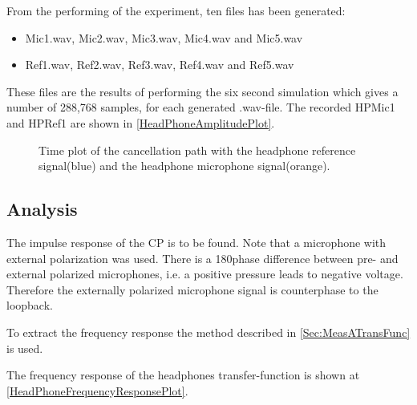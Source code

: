 From the performing of the experiment, ten files has been generated:
\begin{itemize}
	\item Mic1.wav, Mic2.wav, Mic3.wav, Mic4.wav and Mic5.wav
	\item Ref1.wav, Ref2.wav, Ref3.wav, Ref4.wav and Ref5.wav
\end{itemize}

These files are the results of performing the six second simulation which gives a number of 288,768 samples, for each generated .wav-file. 
The recorded HPMic1 and HPRef1 are shown in \autoref{HeadPhoneAmplitudePlot}.


\begin{figure}[H]
	\centering
	
	\caption{Time plot of the cancellation path with the headphone reference signal(blue) and the headphone microphone signal(orange).}
	\label{HeadPhoneAmplitudePlot}
\end{figure}


\subsection{Analysis}
The impulse response of the CP is to be found.
Note that a microphone with external polarization was used. There is a 180\textdegree phase difference between pre- and external polarized microphones, i.e. a positive pressure leads to negative voltage. Therefore the externally polarized microphone signal is counterphase to the loopback. \cite{michandbook}

To extract the frequency response the method described in \autoref{Sec:MeasATransFunc} is used.


The frequency response of the headphones transfer-function is shown at \autoref{HeadPhoneFrequencyResponsePlot}.

